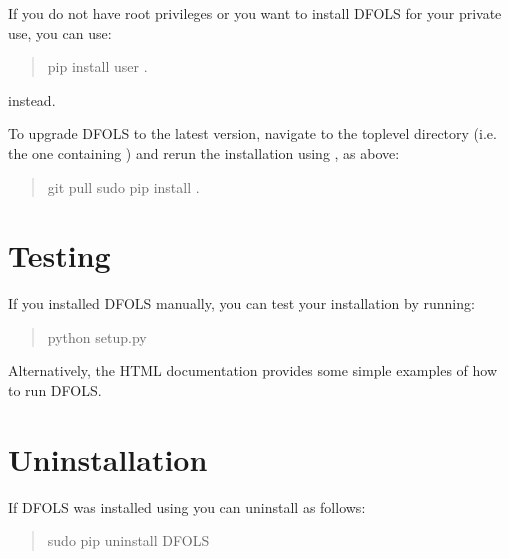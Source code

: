 \documentclass[letterpaper,10pt,english]{sphinxmanual}
\begin{document}
If you do not have root privileges or you want to install DFO\sphinxhyphen{}LS for your private use, you can use:
\begin{quote}

\begin{sphinxVerbatim}[commandchars=\\\{\}]
\PYGZdl{} pip install \PYGZhy{}\PYGZhy{}user .
\end{sphinxVerbatim}
\end{quote}

instead.

To upgrade DFO\sphinxhyphen{}LS to the latest version, navigate to the top\sphinxhyphen{}level directory (i.e. the one containing ) and rerun the installation using , as above:
\begin{quote}

\begin{sphinxVerbatim}[commandchars=\\\{\}]
\PYGZdl{} git pull
\PYGZdl{} \PYG{o}{[}sudo\PYG{o}{]} pip install .  
\end{sphinxVerbatim}
\end{quote}


\section{Testing}
\label{\detokenize{install:testing}}
If you installed DFO\sphinxhyphen{}LS manually, you can test your installation by running:
\begin{quote}

\begin{sphinxVerbatim}[commandchars=\\\{\}]
\PYGZdl{} python setup.py 
\end{sphinxVerbatim}
\end{quote}

Alternatively, the HTML documentation provides some simple examples of how to run DFO\sphinxhyphen{}LS.


\section{Uninstallation}
\label{\detokenize{install:uninstallation}}
If DFO\sphinxhyphen{}LS was installed using  you can uninstall as follows:
\begin{quote}

\begin{sphinxVerbatim}[commandchars=\\\{\}]
\PYGZdl{} \PYG{o}{[}sudo\PYG{o}{]} pip uninstall DFO\PYGZhy{}LS
\end{sphinxVerbatim}
\end{quote}
\end{document}
